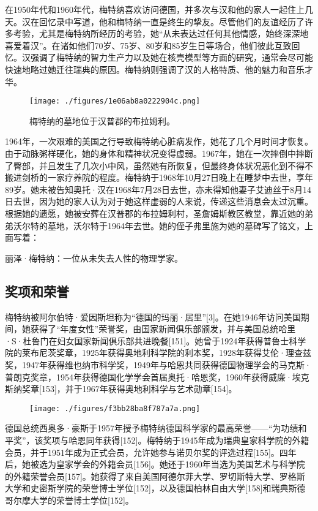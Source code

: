 在1950年代和1960年代，梅特纳喜欢访问德国，并多次与汉和他的家人一起住上几天。汉在回忆录中写道，他和梅特纳一直是终生的挚友。尽管他们的友谊经历了许多考验，尤其是梅特纳所经历的考验，她“从未表达过任何其他情感，始终深深地喜爱着汉”。在诸如他们70岁、75岁、80岁和85岁生日等场合，他们彼此互致回忆。汉强调了梅特纳的智力生产力以及她在核壳模型等方面的研究，通常会尽可能快速地略过她迁往瑞典的原因。梅特纳则强调了汉的人格特质、他的魅力和音乐才华。
\begin{figure}[ht]
\centering
\texttt{[image: ./figures/1e06ab8a0222904c.png]}
\caption{梅特纳的墓地位于汉普郡的布拉姆利。} \label{fig_LZm_15}
\end{figure}
1964年，一次艰难的美国之行导致梅特纳心脏病发作，她花了几个月时间才恢复。由于动脉粥样硬化，她的身体和精神状况变得虚弱。1967年，她在一次摔倒中摔断了臀部，并且发生了几次小中风，虽然她有所恢复，但最终身体状况恶化到不得不搬进剑桥的一家疗养院的程度。梅特纳于1968年10月27日晚上在睡梦中去世，享年89岁。她未被告知奥托·汉在1968年7月28日去世，亦未得知他妻子艾迪丝于8月14日去世，因为她的家人认为对于她这样虚弱的人来说，传递这些消息会太过沉重。根据她的遗愿，她被安葬在汉普郡的布拉姆利村，圣詹姆斯教区教堂，靠近她的弟弟沃尔特的墓地，沃尔特于1964年去世。她的侄子弗里施为她的墓碑写了铭文，上面写着：

丽泽·梅特纳：一位从未失去人性的物理学家。
\subsection{奖项和荣誉}
梅特纳被阿尔伯特·爱因斯坦称为“德国的玛丽·居里”[3]。在她1946年访问美国期间，她获得了“年度女性”荣誉奖，由国家新闻俱乐部颁发，并与美国总统哈里·S·杜鲁门在妇女国家新闻俱乐部共进晚餐[151]。她曾于1924年获得普鲁士科学院的莱布尼茨奖章，1925年获得奥地利科学院的利本奖，1928年获得艾伦·理查兹奖，1947年获得维也纳市科学奖，1949年与哈恩共同获得德国物理学会的马克斯·普朗克奖章，1954年获得德国化学学会首届奥托·哈恩奖，1960年获得威廉·埃克斯纳奖章[153]，并于1967年获得奥地利科学与艺术勋章[154]。
\begin{figure}[ht]
\centering
\texttt{[image: ./figures/f3bb28ba8f787a7a.png]}
\caption{} \label{fig_LZm_16}
\end{figure}
德国总统西奥多·豪斯于1957年授予梅特纳德国科学家的最高荣誉——“为功绩和平奖”，该奖项与哈恩同年获得[152]。梅特纳于1945年成为瑞典皇家科学院的外籍会员，并于1951年成为正式会员，允许她参与诺贝尔奖的评选过程[155]。四年后，她被选为皇家学会的外籍会员[156]。她还于1960年当选为美国艺术与科学院的外籍荣誉会员[157]。她获得了来自美国阿德尔菲大学、罗切斯特大学、罗格斯大学和史密斯学院的荣誉博士学位[152]，以及德国柏林自由大学[158]和瑞典斯德哥尔摩大学的荣誉博士学位[152]。

